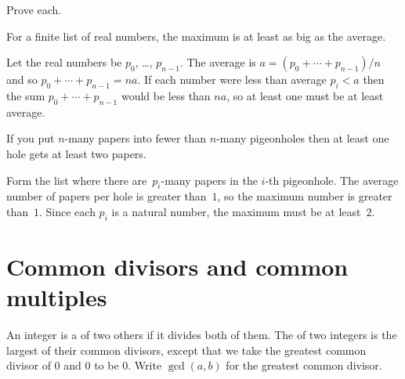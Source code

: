 \documentclass{ibl}  %
\begin{document}
\begin{problem}[\midlength]    Prove each.
\begin{exes}
\begin{exercise} 
  For a finite list of real numbers,
  the maximum is at least as big as the average.
\end{exercise}
\begin{answer}
  Let the real numbers be $p_0$, \ldots, $p_{n-1}$.
  The average is $a=(p_0+\cdots+p_{n-1})/n$ and so 
  $p_0+\cdots+p_{n-1}=na$.
  If each number were less than average $p_i<a$ then the sum
  $p_0+\cdots+p_{n-1}$ would be less than $na$, so at least
  one must be at least average.  
\end{answer}
\begin{exercise} If you put $n$-many papers into fewer than $n$-many
  pigeonholes then at least one hole gets at least two papers.
\end{exercise}
\begin{answer}
  Form the list where there are~$p_i$-many papers in the $i$-th pigeonhole.
  The average number of papers per hole is greater than~$1$, 
  so the maximum number is greater than~$1$.
  Since each $p_i$ is a natural number, the maximum must be at least~$2$.  
\end{answer}
\end{exes}
\end{problem}







\section{Common divisors and common multiples}

\begin{df}
An integer is a  of two others if it
divides both of them.
The  of two integers 
is the largest of their common divisors,
except that we take the greatest common divisor of $0$ and $0$ 
to be $0$.
Write $\gcd(a,b)$ for the greatest common divisor.
\end{df}
\end{document}
